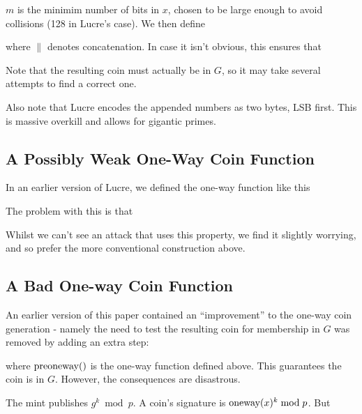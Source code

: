 \documentclass[a4paper,titlepage]{article}
\begin{document}

$m$ is the minimim number of bits in $x$, chosen to be large
enough to avoid collisions (128 in Lucre's case). We then define


where $\|$ denotes concatenation. In case it isn't obvious, this
ensures that


Note that the resulting coin must actually be in $G$, so it may take
several attempts to find a correct one.

Also note that Lucre encodes the appended numbers as two bytes, LSB
first. This is massive overkill and allows for gigantic primes.

\subsection{A Possibly Weak One-Way Coin Function}

In an earlier version of Lucre, we defined the one-way function like
this



The problem with this is that


Whilst we can't see an attack that uses this property, we find it
slightly worrying, and so prefer the more conventional construction above.

\subsection{A Bad One-way Coin Function}
\label{sec:badoneway}

An earlier version of this paper contained an ``improvement'' to the
one-way coin generation - namely the need to test the resulting coin
for membership in $G$ was removed by adding an extra step:


where $\preoneway$ is the one-way function defined above. This guarantees
the coin is in $G$. However, the consequences are disastrous\cite{Wagner}.

The mint publishes $g^k \bmod p$. A coin's signature is $\textrm{oneway}(x)^k \bmod p$. But
\end{document}
